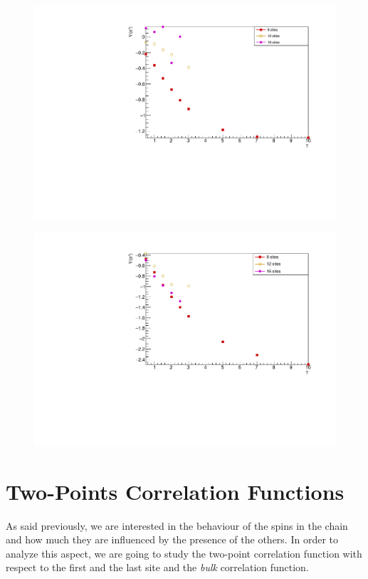 \begin{figure}[H]
    \centering
    \includegraphics[scale=0.7]{Figures/gradLMvsGammavsSize.pdf}
    \caption{}
    \label{fig:my_label}
\end{figure}

\begin{figure}[H]
    \centering
    \includegraphics[scale=0.7]{Figures/gradLMvsGammavsSize_firstQuarterChain.pdf}
    \caption{}
    \label{fig:my_label}
\end{figure}

\section{Two-Points Correlation Functions}
As said previously, we are interested in the behaviour of the spins in the chain and how much they are influenced by the presence of the others. In order to analyze this aspect, we are going to study the two-point correlation function with respect to the first and the last site and the \emph{bulk} correlation function.

